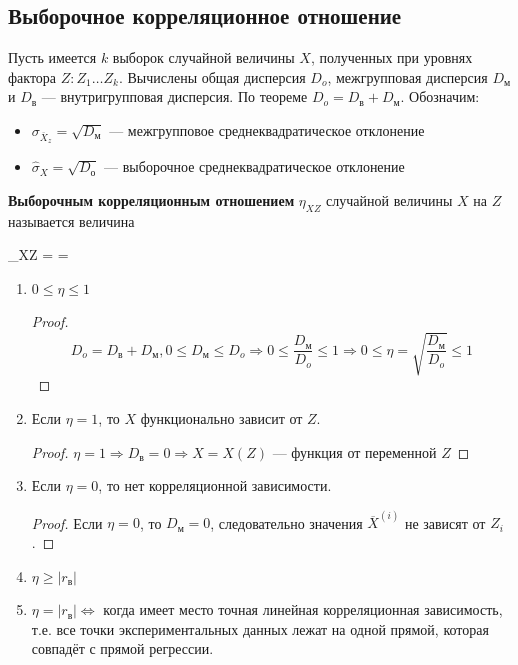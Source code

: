 \subsection{Выборочное корреляционное отношение}

Пусть имеется \(k\) выборок случайной величины \(X\), полученных при уровнях фактора \(Z : Z_1 \dots Z_k\). Вычислены общая дисперсия \(D_o\), межгрупповая дисперсия \(D_{\mathrm{м}}\) и \(D_{\mathrm{в}}\) --- внутригрупповая дисперсия. По теореме  \(D_o = D_{\mathrm{в}} + D_{\mathrm{м}}\). Обозначим:
\begin{itemize}
    \item \(\sigma_{ \overline{X}_z} = \sqrt{D_{\mathrm{м}}}\) --- межгрупповое среднеквадратическое отклонение
    \item \(\hat{\sigma}_X = \sqrt{D_{\mathrm{о}}}\) --- выборочное   среднеквадратическое отклонение
\end{itemize}

\begin{definition}
    \textbf{Выборочным корреляционным отношением} \(\eta_{XZ}\) случайной величины \(X\) на \(Z\) называется величина
    \begin{myemph}
        \eta_{XZ} =  = 
    \end{myemph}
\end{definition}

\begin{prop}\itemfix
    \begin{enumerate}
        \item \(0 \leq \eta \leq 1\)
              \begin{proof}
                  \[D_o = D_{\mathrm{в}} + D_{\mathrm{м}}, 0 \leq D_{\mathrm{м}} \leq D_o \Rightarrow 0 \leq \frac{D_{\mathrm{м}}}{D_o} \leq 1 \Rightarrow 0 \leq \eta = \sqrt{\frac{D_{\mathrm{м}}}{D_o}} \leq 1\]
              \end{proof}
        \item Если \(\eta = 1\), то \(X\) функционально зависит от \(Z\).
              \begin{proof}
                  \(\eta = 1 \Rightarrow D_{\mathrm{в}} = 0 \Rightarrow X = X(Z)\) --- функция от переменной \(Z\)
              \end{proof}
        \item Если \(\eta = 0\), то нет корреляционной зависимости.
              \begin{proof}
                  Если \(\eta = 0\), то \(D_{\mathrm{м}} = 0\), следовательно значения \(\overline{X}^{(i)}\) не зависят от \(Z_i\).
              \end{proof}
        \item \(\eta \geq |r_{\mathrm{в}}|\)
        \item \(\eta = |r_{\mathrm{в}}| \Leftrightarrow \) когда имеет место точная линейная корреляционная зависимость, т.е. все точки экспериментальных данных лежат на одной прямой, которая совпадёт с прямой регрессии.
    \end{enumerate}
\end{prop}
